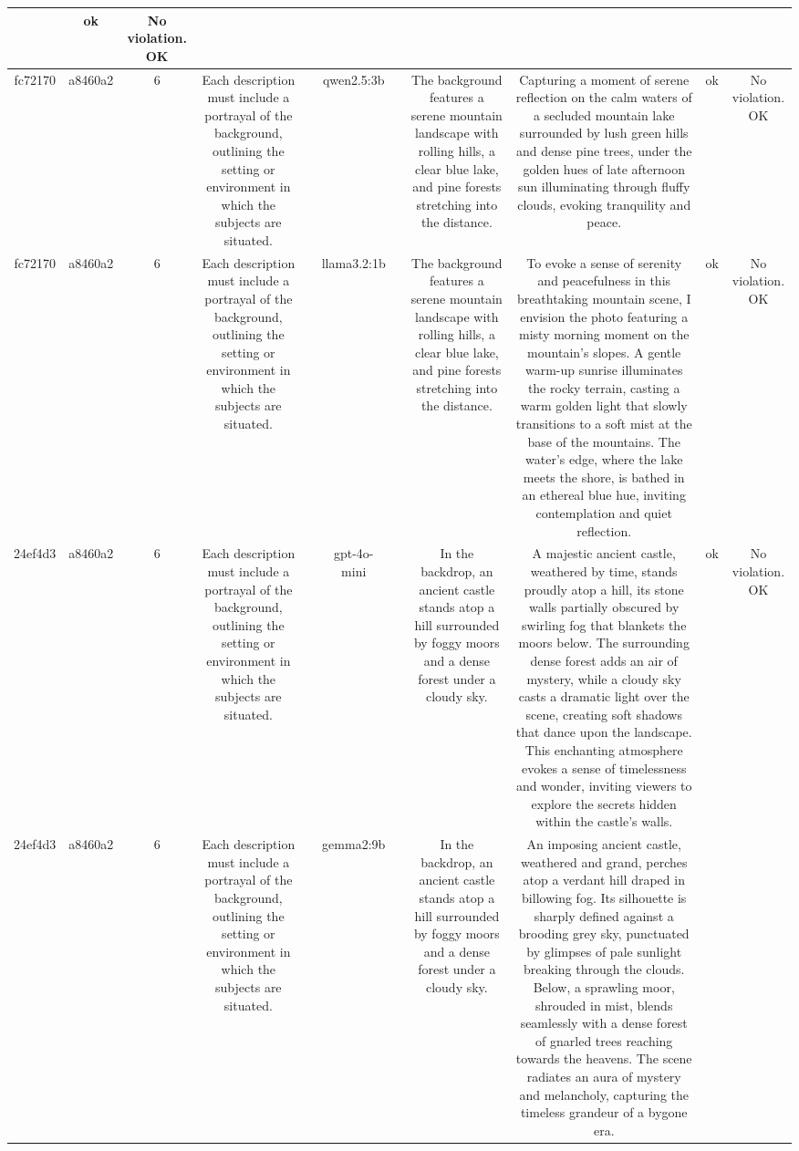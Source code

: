 \begin{table}[h!]
\begin{tabular}{|c|c|c|c|c|c|c|c|c|c|c|}
 & ok & No violation.
OK\\
\hline
fc72170 & a8460a2 & 6 & Each description must include a portrayal of the background, outlining the setting or environment in which the subjects are situated. &  & qwen2.5:3b &  & The background features a serene mountain landscape with rolling hills, a clear blue lake, and pine forests stretching into the distance. & Capturing a moment of serene reflection on the calm waters of a secluded mountain lake surrounded by lush green hills and dense pine trees, under the golden hues of late afternoon sun illuminating through fluffy clouds, evoking tranquility and peace. & ok & No violation.
OK\\
\hline
fc72170 & a8460a2 & 6 & Each description must include a portrayal of the background, outlining the setting or environment in which the subjects are situated. &  & llama3.2:1b &  & The background features a serene mountain landscape with rolling hills, a clear blue lake, and pine forests stretching into the distance. & To evoke a sense of serenity and peacefulness in this breathtaking mountain scene, I envision the photo featuring a misty morning moment on the mountain's slopes. A gentle warm-up sunrise illuminates the rocky terrain, casting a warm golden light that slowly transitions to a soft mist at the base of the mountains. The water's edge, where the lake meets the shore, is bathed in an ethereal blue hue, inviting contemplation and quiet reflection. & ok & No violation.
OK\\
\hline
24ef4d3 & a8460a2 & 6 & Each description must include a portrayal of the background, outlining the setting or environment in which the subjects are situated. &  & gpt-4o-mini &  & In the backdrop, an ancient castle stands atop a hill surrounded by foggy moors and a dense forest under a cloudy sky. & A majestic ancient castle, weathered by time, stands proudly atop a hill, its stone walls partially obscured by swirling fog that blankets the moors below. The surrounding dense forest adds an air of mystery, while a cloudy sky casts a dramatic light over the scene, creating soft shadows that dance upon the landscape. This enchanting atmosphere evokes a sense of timelessness and wonder, inviting viewers to explore the secrets hidden within the castle's walls. & ok & No violation.
OK\\
\hline
24ef4d3 & a8460a2 & 6 & Each description must include a portrayal of the background, outlining the setting or environment in which the subjects are situated. &  & gemma2:9b &  & In the backdrop, an ancient castle stands atop a hill surrounded by foggy moors and a dense forest under a cloudy sky. & An imposing ancient castle, weathered and grand, perches atop a verdant hill draped in billowing fog. Its silhouette is sharply defined against a brooding grey sky, punctuated by glimpses of pale sunlight breaking through the clouds. Below, a sprawling moor, shrouded in mist, blends seamlessly with a dense forest of gnarled trees reaching towards the heavens. The scene radiates an aura of mystery and melancholy, capturing the timeless grandeur of a bygone era.  



\end{tabular}
\end{table}
